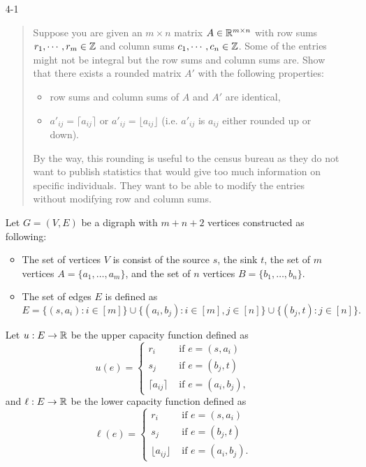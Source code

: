 \documentclass[12pt]{article}
\begin{document}




\begin{enumerate}

\item[4-1]
\begin{quote}
Suppose you are given an $m\times n$ matrix $A \in {\mathbb R}^{m\times n}$ with row sums $r_1,\cdots,r_m\in {\mathbb Z}$ and column sums $c_1,\cdots, c_n \in {\mathbb Z}$. Some of the entries might not be integral but the row sums and column sums are. Show that there exists a rounded matrix $A'$ with the following properties:
\begin{itemize}
\item row sums and column sums of $A$ and $A'$ are identical,
\item $a'_{ij} = \lceil a_{ij} \rceil$ or $a'_{ij} = \lfloor a_{ij} \rfloor$ (i.e. $a'_{ij}$ is $a_{ij}$ either rounded up or down).
\end{itemize}
By the way, this rounding is useful to the census bureau as they do not want to publish statistics that would give too much information on specific individuals. They want to be able to modify the entries without modifying row and column sums.
\end{quote}

Let $G = (V, E)$ be a digraph with $m+n+2$ vertices constructed as following:
\begin{itemize}
\item The set of vertices $V$ is consist of the source $s$, the sink $t$, the set of $m$ vertices $A = \{a_1,\dotsc,a_m\}$, and the set of $n$ vertices $B = \{b_1,\dotsc,b_n\}$.
\item The set of edges $E$ is defined as
$$
E = \{(s, a_i): i \in [m]\} \cup \{(a_i,b_j): i \in [m], j \in [n]\} \cup \{(b_j,t): j \in [n]\}.
$$
\end{itemize}
Let $u : E \to {\mathbb R}$ be the upper capacity function defined as
$$
u(e) = \begin{cases}
r_i & \text{ if $e = (s, a_i)$} \\
s_j & \text{ if $e = (b_j, t)$} \\
\lceil a_{ij} \rceil & \text{ if $e = (a_i, b_j)$},
\end{cases}
$$
and $\ell: E \to {\mathbb R}$ be the lower capacity function defined as
$$
\ell(e) = \begin{cases}
r_i & \text{ if $e = (s, a_i)$} \\
s_j & \text{ if $e = (b_j, t)$} \\
\lfloor a_{ij}\rfloor & \text{ if $e = (a_i, b_j)$}.
\end{cases}
$$


\end{enumerate}
\end{document}
